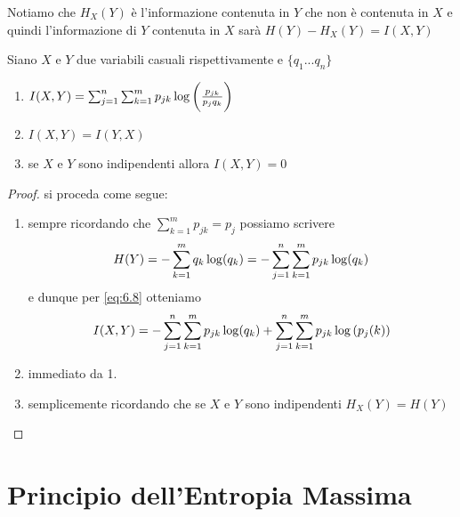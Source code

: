 Notiamo che $H_X(Y)$ è l'informazione contenuta in $Y$ che non è contenuta in $X$ e quindi l'informazione di $Y$ contenuta in $X$ sarà $H(Y)-H_X(Y)=I(X,Y)$
\begin{teo} \label{teo:6.7}
Siano $X$ e $Y$ due variabili casuali rispettivamente  \lep e  $\{q_1...q_n \}$
\begin{enumerate}
\item $I(X,Y)=\sum_{j=1}^n \sum_{k=1}^m p_{jk} \log \bigg( \frac{p_{jk}}{p_j q_k} \bigg)$
\item $I(X,Y)=I(Y,X)$
\item se $X$ e $Y$ sono indipendenti allora $I(X,Y)=0$
\end{enumerate}
\end{teo}
\begin{proof}
si proceda come segue:
\begin{enumerate}
\item sempre ricordando che $\sum_{k=1}^m p_{jk}=p_j$ possiamo scrivere 
$$H(Y)=-\sum_{k=1}^m q_{k} \log (q_k)=-\sum_{j=1}^n \sum_{k=1}^m p_{jk} \log (q_k)$$
e dunque per \ref{eq:6.8} otteniamo
$$I(X,Y)=-\sum_{j=1}^n \sum_{k=1}^m p_{jk} \log(q_k)+\sum_{j=1}^n \sum_{k=1}^m p_{jk}\log{(p_j(k))}$$
\item immediato da 1.
\item semplicemente ricordando che se $X$ e $Y$ sono indipendenti $H_X(Y)=H(Y)$
\end{enumerate}
\end{proof}

\vspace{15pt}


\section{Principio dell'Entropia Massima}
\label{sec:maxEntropia}
\vspace{10pt}

